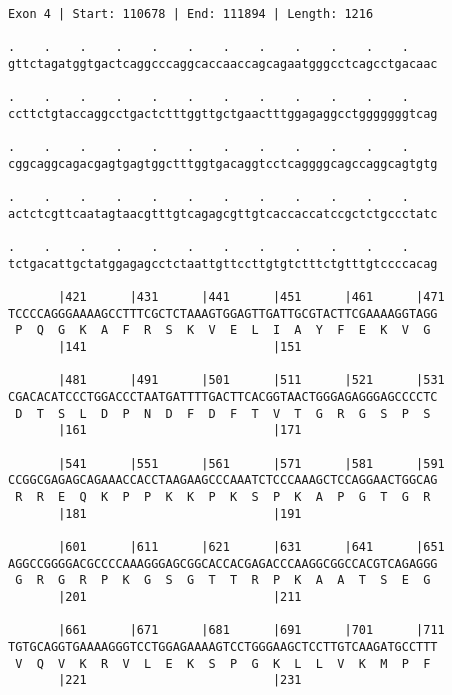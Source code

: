 \documentclass{article}
\begin{document}
\begin{Verbatim}[fontfamily=courier]
Exon 4 | Start: 110678 | End: 111894 | Length: 1216

.    .    .    .    .    .    .    .    .    .    .    .    
gttctagatggtgactcaggcccaggcaccaaccagcagaatgggcctcagcctgacaac

.    .    .    .    .    .    .    .    .    .    .    .    
ccttctgtaccaggcctgactctttggttgctgaactttggagaggcctgggggggtcag

.    .    .    .    .    .    .    .    .    .    .    .    
cggcaggcagacgagtgagtggctttggtgacaggtcctcaggggcagccaggcagtgtg

.    .    .    .    .    .    .    .    .    .    .    .    
actctcgttcaatagtaacgtttgtcagagcgttgtcaccaccatccgctctgccctatc

.    .    .    .    .    .    .    .    .    .    .    .    
tctgacattgctatggagagcctctaattgttccttgtgtctttctgtttgtccccacag

       |421      |431      |441      |451      |461      |471
TCCCCAGGGAAAAGCCTTTCGCTCTAAAGTGGAGTTGATTGCGTACTTCGAAAAGGTAGG
 P  Q  G  K  A  F  R  S  K  V  E  L  I  A  Y  F  E  K  V  G 
       |141                          |151                   

       |481      |491      |501      |511      |521      |531
CGACACATCCCTGGACCCTAATGATTTTGACTTCACGGTAACTGGGAGAGGGAGCCCCTC
 D  T  S  L  D  P  N  D  F  D  F  T  V  T  G  R  G  S  P  S 
       |161                          |171                   

       |541      |551      |561      |571      |581      |591
CCGGCGAGAGCAGAAACCACCTAAGAAGCCCAAATCTCCCAAAGCTCCAGGAACTGGCAG
 R  R  E  Q  K  P  P  K  K  P  K  S  P  K  A  P  G  T  G  R 
       |181                          |191                   

       |601      |611      |621      |631      |641      |651
AGGCCGGGGACGCCCCAAAGGGAGCGGCACCACGAGACCCAAGGCGGCCACGTCAGAGGG
 G  R  G  R  P  K  G  S  G  T  T  R  P  K  A  A  T  S  E  G 
       |201                          |211                   

       |661      |671      |681      |691      |701      |711
TGTGCAGGTGAAAAGGGTCCTGGAGAAAAGTCCTGGGAAGCTCCTTGTCAAGATGCCTTT
 V  Q  V  K  R  V  L  E  K  S  P  G  K  L  L  V  K  M  P  F 
       |221                          |231                   

\end{Verbatim}
\newpage
\end{document}
